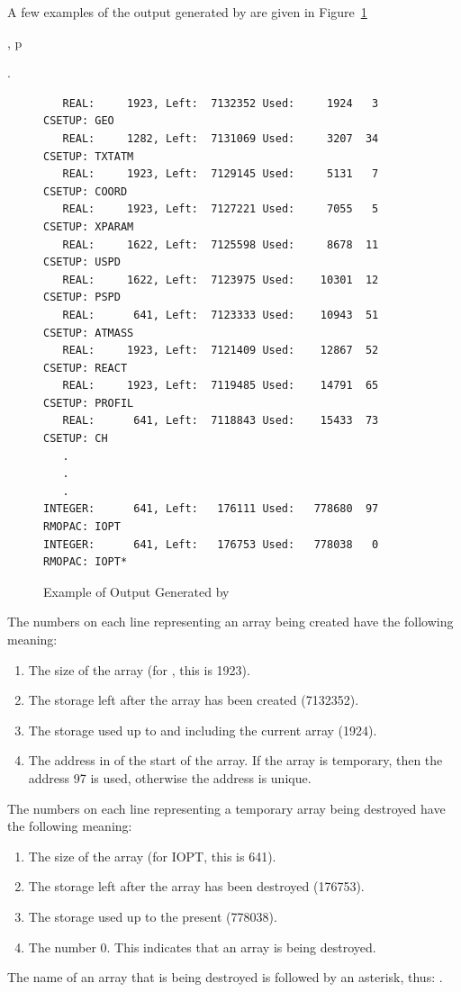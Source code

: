 A few examples of the output generated by  are given in
Figure~\ref{sizes_ex}
\begin{latexonly}
, p~\pageref{sizes_ex}
\end{latexonly}.
\begin{figure}
\begin{makeimage}
\end{makeimage}
\compresstable
\begin{verbatim}
   REAL:     1923, Left:  7132352 Used:     1924   3  CSETUP: GEO
   REAL:     1282, Left:  7131069 Used:     3207  34  CSETUP: TXTATM
   REAL:     1923, Left:  7129145 Used:     5131   7  CSETUP: COORD
   REAL:     1923, Left:  7127221 Used:     7055   5  CSETUP: XPARAM
   REAL:     1622, Left:  7125598 Used:     8678  11  CSETUP: USPD
   REAL:     1622, Left:  7123975 Used:    10301  12  CSETUP: PSPD
   REAL:      641, Left:  7123333 Used:    10943  51  CSETUP: ATMASS
   REAL:     1923, Left:  7121409 Used:    12867  52  CSETUP: REACT
   REAL:     1923, Left:  7119485 Used:    14791  65  CSETUP: PROFIL
   REAL:      641, Left:  7118843 Used:    15433  73  CSETUP: CH
   .
   .
   .
INTEGER:      641, Left:   176111 Used:   778680  97  RMOPAC: IOPT
INTEGER:      641, Left:   176753 Used:   778038   0  RMOPAC: IOPT*
\end{verbatim}
\caption{\label{sizes_ex}Example of Output Generated by }
\end{figure}

The numbers on each line representing an array being created have the following
meaning:
\begin{enumerate}
\item The size of the array (for , this is 1923).
\item The storage left after the array has been created (7132352).
\item The storage used up to and including the current array (1924).
\item The address in  of the start of the array. If the
array is temporary, then the address 97 is used, otherwise the address
is unique.
\end{enumerate}

The numbers on each line representing a temporary array being destroyed
 have the following meaning:
\begin{enumerate}
\item The size of the array (for IOPT, this is 641).
\item The storage left after the array has been destroyed (176753).
\item The storage used up to the present (778038).
\item The number 0.  This indicates that an array is being destroyed.
\end{enumerate}
The name of an array that is being destroyed is followed by an asterisk,
thus: .

